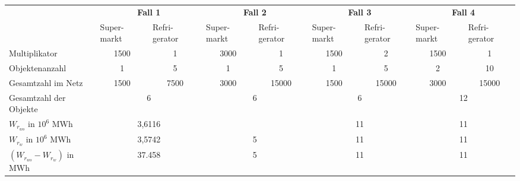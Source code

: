 \begin{table}
\footnotesize{
\centering
\begin{tabularx}{\textwidth}{X|X|X|X|X|X|X|X|X|}
\cline{2-9}
& \multicolumn{2}{c|}{\textbf{Fall 1}} & \multicolumn{2}{c|}{\textbf{Fall 2}}
&  \multicolumn{2}{c|}{\textbf{Fall 3}} &  \multicolumn{2}{c|}{\textbf{Fall 4}}\\
 \cline{2-9}
& Super- \linebreak markt & Refri- \linebreak gerator & Super- \linebreak markt
& Refri- \linebreak gerator & Super- \linebreak markt & Refri-\linebreak gerator
& Super- \linebreak markt & Refri-\linebreak gerator \\
\hline
\multicolumn{1}{|l|}{Multiplikator} & \multicolumn{1}{c|}{1500} &
\multicolumn{1}{c|}{1} & \multicolumn{1}{c|}{3000} & \multicolumn{1}{c|}{1} &
\multicolumn{1}{c|}{1500} & \multicolumn{1}{c|}{2} & \multicolumn{1}{c|}{1500} &
\multicolumn{1}{c|}{1} \\
\hline
\multicolumn{1}{|l|}{Objektenanzahl} & \multicolumn{1}{c|}{1} &
\multicolumn{1}{c|}{5}& \multicolumn{1}{c|}{1} & \multicolumn{1}{c|}{5} &
\multicolumn{1}{c|}{1}& \multicolumn{1}{c|}{5} & \multicolumn{1}{c|}{2}&
\multicolumn{1}{c|}{10} \\
\hline
\multicolumn{1}{|l|}{Gesamtzahl im Netz} & \multicolumn{1}{c|}{1500} &
\multicolumn{1}{c|}{7500}& \multicolumn{1}{c|}{3000} & \multicolumn{1}{c|}{15000} &
\multicolumn{1}{c|}{1500} & \multicolumn{1}{c|}{15000} & \multicolumn{1}{c|}{3000}&
\multicolumn{1}{c|}{15000} \\
\hline
\multicolumn{1}{|l|}{Gesamtzahl der Objekte} & \multicolumn{2}{c|}{6} &
\multicolumn{2}{c|}{6} & \multicolumn{2}{c|}{6} & \multicolumn{2}{c|}{12}\\
\hline
\hline
\multicolumn{1}{|l|}{$W_{r_{wo}}$ in $10^6$ MWh } & \multicolumn{2}{c|}{3,6116} &
\multicolumn{2}{c|}{} & \multicolumn{2}{c|}{11} & \multicolumn{2}{c|}{11}\\
\hline
\multicolumn{1}{|l|}{$W_{r_{w}}$ in $10^6$ MWh} & \multicolumn{2}{c|}{3,5742} &
\multicolumn{2}{c|}{5} & \multicolumn{2}{c|}{11} & \multicolumn{2}{c|}{11}\\
\hline
\multicolumn{1}{|l|}{$(W_{r_{wo}} - W_{r_{w}})$ in MWh} &
\multicolumn{2}{c|}{37.458} &
\multicolumn{2}{c|}{5} & \multicolumn{2}{c|}{11} & \multicolumn{2}{c|}{11}\\

\end{tabularx}}
\end{table}
